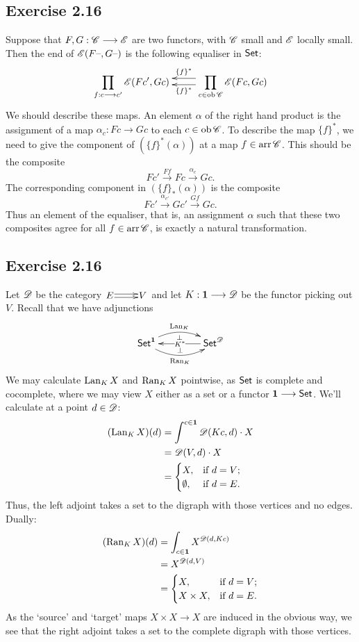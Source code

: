 \documentclass[11pt]{article}
\begin{document}
\begin{solutions}
\subsection*{Exercise 2.16}
Suppose that $F,G:\mathscr{C}\longrightarrow\mathscr{E}$ are two functors, with $\mathscr{C}$ small and $\mathscr{E}$ locally small.
Then the end of $\mathscr{E}(F\textup{--} ,G\textup{--} )$ is the following equaliser in $\operatorname{{\mathsf{Set}}}$:
\[\vcenter{\xymatrix{
\displaystyle\prod_{f:c\to c'}\scrE(Fc',Gc)&%
\displaystyle\prod_{c\in\ob\scrC} \scrE(Fc,Gc)
\ar@<-1ex>[l]_-{\{f\}^*}
\ar@<.51ex>[l]^-{\{f\}^*}
}}\]
We should describe these maps. An element $\alpha$ of the right hand product is the assignment of a map $\alpha_c:Fc\to Gc$ to each $c\in\textup{ob}\,\mathscr{C}$. To describe  the map $\{f\}^*$, we need to give the component of $(\{f\}^*(\alpha))$ at a map $f\in\textup{arr}\,\mathscr{C}$. This should be the composite
\[Fc'\overset{Ff}{\to}Fc\overset{\alpha_c}{\to}Gc.\]
The corresponding component in $(\{f\}_*(\alpha))$ is the composite
\[Fc'\overset{\alpha_{c'}}{\to}Gc'\overset{Gf}{\to}Gc.\]
Thus an element of the equaliser, that is, an assignment $\alpha$ such that these two composites agree for all $f\in\textup{arr}\,\mathscr{C}$, is exactly a natural transformation.
\subsection*{Exercise 2.16}
Let $\mathscr{D}$ be the category 
$\vcenter{\xymatrix@1{
E
\ar@<-.35ex>[r]
\ar@<.5ex>[r]
&%
V%
}}$
and let $K:\textbf{1}\longrightarrow \mathscr{D}$ be the functor picking out $V$. Recall that we have adjunctions
\[\xymatrix@C=1.5cm{
\Set^\textbf{1}
\ar@/^1.2em/[r]^-{\Lan_K}_-{\perp} \ar@/_1.2em/[r]_-{\Ran_K}^-{\perp}&%
\Set^\scrD\ar[l]|{K^*}%
}\]
We may calculate $\operatorname{Lan}_KX$ and $\operatorname{Ran}_KX$ pointwise, as $\operatorname{{\mathsf{Set}}}$ is complete and cocomplete, where we may view $X$ either as a set or a functor $\textbf{1}\longrightarrow\operatorname{{\mathsf{Set}}}$. We'll calculate at a point $d\in\mathscr{D}$:
\begin{alignat*}{2}
(\Lan_KX)(d)
&=
\int^{c\in\textbf{1}}\scrD(Kc,d)\cdot X%
\\
&=
\scrD(V,d)\cdot X%
\\
&=
\begin{cases}
X,&\textup{if }d=V;\\
\emptyset,&\textup{if }d=E.
\end{cases}
\end{alignat*}
Thus, the left adjoint takes a set to the digraph with those vertices and no edges. Dually:
\begin{alignat*}{2}
(\Ran_KX)(d)
&=
\int_{c\in\textbf{1}}X^{\scrD(d,Kc)}%
\\
&=
X^{\scrD(d,V)}%
\\
&=
\begin{cases}
X,&\textup{if }d=V;\\
X\times X,&\textup{if }d=E.
\end{cases}
\end{alignat*}
As the `source' and `target' maps $X\times X\to X$ are induced in the obvious way, we see that the right adjoint takes a set to the complete digraph with those vertices.

\end{solutions}
\end{document}

